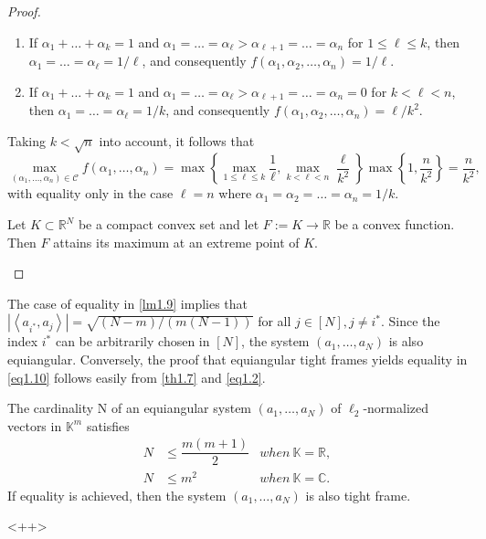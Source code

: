 \begin{proof}
\begin{enumerate}
    \item If $\alpha_1+\dots+\alpha_k = 1$ and $\alpha_1=\dots=\alpha_{\ell} > \alpha_{\ell+1}=\dots=\alpha_n$ for $1 \leq \ell \leq k$, then $\alpha_1 = \dots = \alpha_{\ell} = 1/\ell$, and consequently $f(\alpha_1,\alpha_2,\dots,\alpha_n)=1/\ell$.
    \item If $\alpha_1+\dots+\alpha_k = 1$ and $\alpha_1=\dots=\alpha_{\ell}>\alpha_{\ell+1}=\dots=\alpha_n=0$ for $k<\ell<n$, then $\alpha_1=\dots=\alpha_{\ell}=1/k$, and consequently $f(\alpha_1,\alpha_2,\dots,\alpha_n) = \ell/k^2$.
\end{enumerate}
Taking $k<\sqrt{n}$ into account, it follows that
\[
    \max\limits_{(\alpha_1,\dots,\alpha_n)\in\mathcal{C}} f(\alpha_1,\dots,\alpha_n) = \max\left\{ \max\limits_{1 \leq \ell \leq k}\dfrac{1}{\ell}, \max\limits_{k<\ell<n}\dfrac{\ell}{k^2} \right\} \max\left\{ 1, \dfrac{n}{k^2} \right\} = \dfrac{n}{k^2},
\]
with equality only in the case $\ell=n$ where $\alpha_1=\alpha_2=\dots=\alpha_n=1/k$.
    \begin{mdframed}
        \begin{theorem}
            \label{thb.16}
            Let $K \subset \mathbb{R}^N$ be a compact convex set and let $F := K \rightarrow \mathbb{R}$ be a convex function. Then $F$ attains its maximum at an extreme point of $K$.
        \end{theorem}
    \end{mdframed}
\end{proof}

The case of equality in \cref{lm1.9} implies that $\left|\left<a_{i^*}, a_j\right>\right| = \sqrt{(N-m)/(m(N-1))}$ for all $j \in [N], j\neq i^*$. Since the index $i^*$ can be arbitrarily chosen in $[N]$, the system $(a_1,\dots,a_N)$ is also equiangular. Conversely, the proof that equiangular tight frames yields equality in \cref{eq1.10} follows easily from \cref{th1.7} and \cref{eq1.2}. 

\begin{theorem}
    \label{th1.10}
    The cardinality N of an equiangular system $(a_1,\dots,a_N)$ of $\ell_2$-normalized vectors in $\mathbb{K}^m$ satisfies
    \begin{align*}
        N &\leq \dfrac{m(m+1)}{2}    &when\ \mathbb{K} = \mathbb{R},\\
        N &\leq m^2     &when\ \mathbb{K} = \mathbb{C}.
    \end{align*}
    If equality is achieved, then the system $(a_1,\dots,a_N)$ is also tight frame.
\end{theorem}<++>
